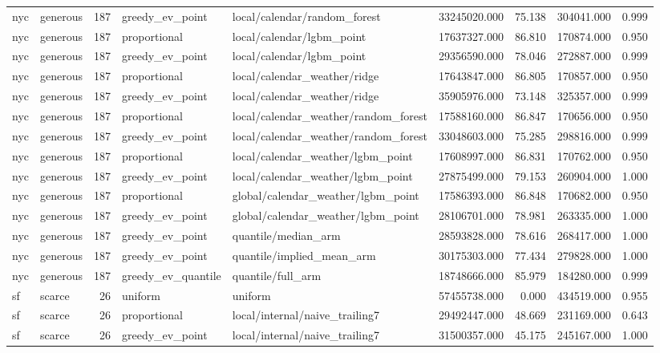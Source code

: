\begin{tabular}{llrllrrrr}
nyc & generous & 187 & greedy\_ev\_point & local/calendar/random\_forest & 33245020.000 & 75.138 & 304041.000 & 0.999 \\
nyc & generous & 187 & proportional & local/calendar/lgbm\_point & 17637327.000 & 86.810 & 170874.000 & 0.950 \\
nyc & generous & 187 & greedy\_ev\_point & local/calendar/lgbm\_point & 29356590.000 & 78.046 & 272887.000 & 0.999 \\
nyc & generous & 187 & proportional & local/calendar\_weather/ridge & 17643847.000 & 86.805 & 170857.000 & 0.950 \\
nyc & generous & 187 & greedy\_ev\_point & local/calendar\_weather/ridge & 35905976.000 & 73.148 & 325357.000 & 0.999 \\
nyc & generous & 187 & proportional & local/calendar\_weather/random\_forest & 17588160.000 & 86.847 & 170656.000 & 0.950 \\
nyc & generous & 187 & greedy\_ev\_point & local/calendar\_weather/random\_forest & 33048603.000 & 75.285 & 298816.000 & 0.999 \\
nyc & generous & 187 & proportional & local/calendar\_weather/lgbm\_point & 17608997.000 & 86.831 & 170762.000 & 0.950 \\
nyc & generous & 187 & greedy\_ev\_point & local/calendar\_weather/lgbm\_point & 27875499.000 & 79.153 & 260904.000 & 1.000 \\
nyc & generous & 187 & proportional & global/calendar\_weather/lgbm\_point & 17586393.000 & 86.848 & 170682.000 & 0.950 \\
nyc & generous & 187 & greedy\_ev\_point & global/calendar\_weather/lgbm\_point & 28106701.000 & 78.981 & 263335.000 & 1.000 \\
nyc & generous & 187 & greedy\_ev\_point & quantile/median\_arm & 28593828.000 & 78.616 & 268417.000 & 1.000 \\
nyc & generous & 187 & greedy\_ev\_point & quantile/implied\_mean\_arm & 30175303.000 & 77.434 & 279828.000 & 1.000 \\
nyc & generous & 187 & greedy\_ev\_quantile & quantile/full\_arm & 18748666.000 & 85.979 & 184280.000 & 0.999 \\
sf & scarce & 26 & uniform & uniform & 57455738.000 & 0.000 & 434519.000 & 0.955 \\
sf & scarce & 26 & proportional & local/internal/naive\_trailing7 & 29492447.000 & 48.669 & 231169.000 & 0.643 \\
sf & scarce & 26 & greedy\_ev\_point & local/internal/naive\_trailing7 & 31500357.000 & 45.175 & 245167.000 & 1.000 \\

\end{tabular}
